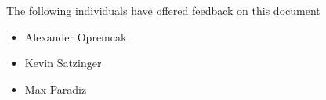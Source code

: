 
The following individuals have offered feedback on this document
\begin{itemize}
  \item Alexander Opremcak
  \item Kevin Satzinger
  \item Max Paradiz
\end{itemize}

